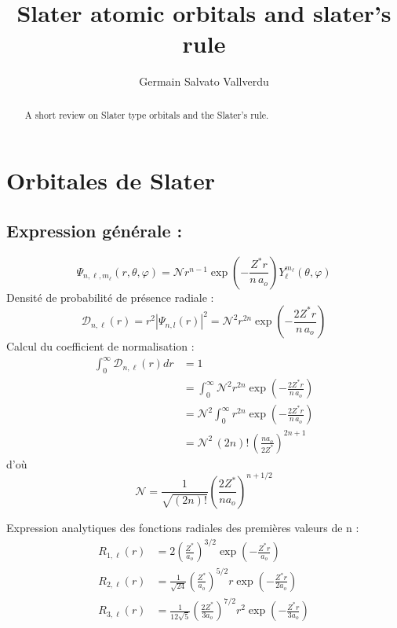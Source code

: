 \documentclass[%
aip,%
jcp,%
amsmath,amssymb,%
reprint,%
]{revtex4-1}
\newcommand*{\radint}{\int_0^{\infty}}
\newcommand*{\Ncal}{\mathcal{N}}
\newcommand*{\spheric}{(r,\theta,\varphi)}			%
\newcommand*{\angulaire}{(\theta,\varphi)}			%
\begin{document}
\title{Slater atomic orbitals and slater's rule}

\author{Germain Salvato Vallverdu}

\begin{abstract}
A short review on Slater type orbitals and the Slater's rule.
\end{abstract}

\maketitle

\section{Orbitales de Slater}

\subsection{Expression générale :}
%
\begin{equation*}
    \Psi_{n,\ell,m_\ell}\spheric = \Ncal r^{n-1} \exp\left( -\frac{Z^* r}{n\,a_o} \right)
    Y_\ell^{m_\ell}\angulaire
\end{equation*}
%
Densité de probabilité de présence radiale :
%
\begin{equation*}
    \mathcal{D}_{n,\ell}(r) = r^2 |\Psi_{n,l}(r)|^2 = \Ncal^2 r^{2n} 
        \exp\left( -\frac{2Z^*r}{n\,a_o} \right)
\end{equation*}
%
Calcul du coefficient de normalisation :
%
\begin{align*}
    \radint \mathcal{D}_{n,\ell}(r) dr  & = 1 \\
    & = \radint \Ncal^2 r^{2n} \exp\left( -\frac{2Z^*r}{n\,a_o} \right) \\
    & = \Ncal^2 \radint r^{2n} \exp\left( -\frac{2Z^*r}{n\,a_o} \right) \\
    & = \Ncal^2 \, (2n)! \, \left(\frac{na_o}{2Z^*}\right)^{2n+1}
\end{align*}
%
d'où
%
\begin{equation*}
    \Ncal =\frac{1}{\sqrt{(2n)!}} \left( \frac{2Z^*}{na_o} \right)^{n+1/2} 
\end{equation*}

Expression analytiques des fonctions radiales des premières valeurs de n :
%
\begin{align*}
    R_{1,\ell}(r) & =  2\left( \frac{Z^*}{a_o} \right)^{3/2} 
        \exp\left( -\frac{Z^* r}{a_o} \right) \\
    R_{2,\ell}(r) & =  \frac{1}{\sqrt{24}} \left( \frac{Z^*}{a_o} \right)^{5/2} r 
        \exp\left( -\frac{Z^* r}{2a_o} \right) \\
    R_{3,\ell}(r) & =  \frac{1}{12\sqrt{5}} \left( \frac{2Z^*}{3a_o} \right)^{7/2} r^2
        \exp\left( -\frac{Z^* r}{3a_o} \right) \\
\end{align*}
\end{document}
